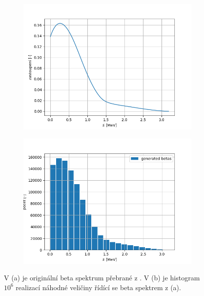 \documentclass[11pt,a4paper]{article}
\begin{document}
\begin{figure}[H]
	\centering
	\begin{subfigure}{0.49\textwidth}
		\centering
		\includegraphics[width=.99\textwidth]{betaSpektrum_Bi.png}
		\caption{}
	\end{subfigure}
	\begin{subfigure}{0.49\textwidth}
		\centering
		\includegraphics[width=.99\textwidth]{betaNahodnaCisla_Bi.png}
		\caption{}
	\end{subfigure}
	\caption{V (a) je originální beta spektrum  přebrané z \cite{betaSpektrum}. V (b) je histogram $10^6$ realizací náhodné veličiny řídící se beta spektrem z (a).}
	\label{fig:betaSpektrum_214Bi}
\end{figure}
\end{document}
